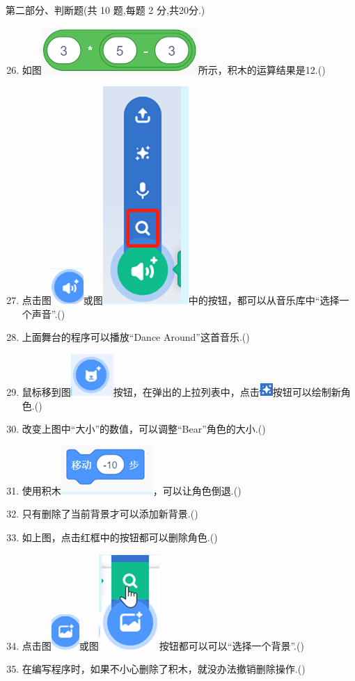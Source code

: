 \documentclass[10.5pt, a4paper]{article}
\begin{document}
    \vspace{1cm}
    {\noindent\heiti 第二部分、判断题(共 10 题,每题 2 分,共20分.)}
    \begin{enumerate}
        \setcounter{enumi}{25}
        \item 如图\includegraphics[width=.12\textwidth]{26.png}所示，积木的运算结果是12.(\qquad)

        \item 点击图\includegraphics[width=.02\textwidth]{27-1.png}或图\includegraphics[width=.04\textwidth]{27-2.png}中的按钮，都可以从音乐库中“选择一个声音”.(\qquad)
        
        \item 上面舞台的程序可以播放“Dance Around”这首音乐.(\qquad)
  
        \item 鼠标移到图\includegraphics[width=.03\textwidth]{29-1.png}按钮，在弹出的上拉列表中，点击\includegraphics[width=.025\textwidth]{29-2.png}按钮可以绘制新角色.(\qquad)
        
        \item 改变上图中“大小”的数值，可以调整“Bear”角色的大小.(\qquad)
        
        \item 使用积木\includegraphics[width=.08\textwidth]{31.png}，可以让角色倒退.(\qquad)
        
        \item 只有删除了当前背景才可以添加新背景.(\qquad)
        
        \item 如上图，点击红框中的按钮都可以删除角色.(\qquad)
        
        \item 点击图\includegraphics[width=.03\textwidth]{34-1.png}或图\includegraphics[width=.03\textwidth]{34-2.png}按钮都可以可以“选择一个背景”.(\qquad)
        
        \item 在编写程序时，如果不小心删除了积木，就没办法撤销删除操作.(\qquad)
    \end{enumerate}
\end{document}
